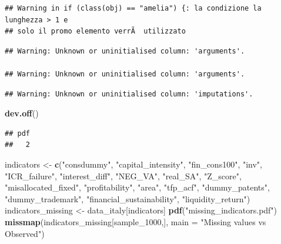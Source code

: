 \documentclass[]{article}
\newenvironment{Shaded}{\begin{snugshade}}{\end{snugshade}}
\newcommand{\DataTypeTok}[1]{\textcolor[rgb]{0.13,0.29,0.53}{#1}}
\newcommand{\DecValTok}[1]{\textcolor[rgb]{0.00,0.00,0.81}{#1}}
\newcommand{\KeywordTok}[1]{\textcolor[rgb]{0.13,0.29,0.53}{\textbf{#1}}}
\newcommand{\NormalTok}[1]{#1}
\newcommand{\StringTok}[1]{\textcolor[rgb]{0.31,0.60,0.02}{#1}}
\begin{document}
\begin{verbatim}
## Warning in if (class(obj) == "amelia") {: la condizione la lunghezza > 1 e
## solo il promo elemento verrÃ  utilizzato
\end{verbatim}

\begin{verbatim}
## Warning: Unknown or uninitialised column: 'arguments'.

## Warning: Unknown or uninitialised column: 'arguments'.
\end{verbatim}

\begin{verbatim}
## Warning: Unknown or uninitialised column: 'imputations'.
\end{verbatim}

\begin{Shaded}
\begin{Highlighting}[]
\KeywordTok{dev.off}\NormalTok{()}
\end{Highlighting}
\end{Shaded}

\begin{verbatim}
## pdf 
##   2
\end{verbatim}

\begin{Shaded}
\begin{Highlighting}[]
\NormalTok{indicators <-}\StringTok{ }\KeywordTok{c}\NormalTok{(}\StringTok{"consdummy"}\NormalTok{, }\StringTok{"capital_intensity"}\NormalTok{, }\StringTok{"fin_cons100"}\NormalTok{,}
                \StringTok{"inv"}\NormalTok{, }\StringTok{"ICR_failure"}\NormalTok{, }\StringTok{"interest_diff"}\NormalTok{, }\StringTok{"NEG_VA"}\NormalTok{,}
                \StringTok{"real_SA"}\NormalTok{, }\StringTok{"Z_score"}\NormalTok{, }\StringTok{"misallocated_fixed"}\NormalTok{,}
                \StringTok{"profitability"}\NormalTok{, }\StringTok{"area"}\NormalTok{, }\StringTok{"tfp_acf"}\NormalTok{, }\StringTok{"dummy_patents"}\NormalTok{,}
                \StringTok{"dummy_trademark"}\NormalTok{, }\StringTok{"financial_sustainability"}\NormalTok{,}
                \StringTok{"liquidity_return"}\NormalTok{) }
\NormalTok{indicators_missing <-}\StringTok{ }\NormalTok{data_italy[indicators]}
\KeywordTok{pdf}\NormalTok{(}\StringTok{"missing_indicators.pdf"}\NormalTok{) }
\KeywordTok{missmap}\NormalTok{(indicators_missing[sample_}\DecValTok{1000}\NormalTok{,],}
        \DataTypeTok{main =} \StringTok{"Missing values vs Observed"}\NormalTok{)}
\end{Highlighting}
\end{Shaded}
\end{document}
